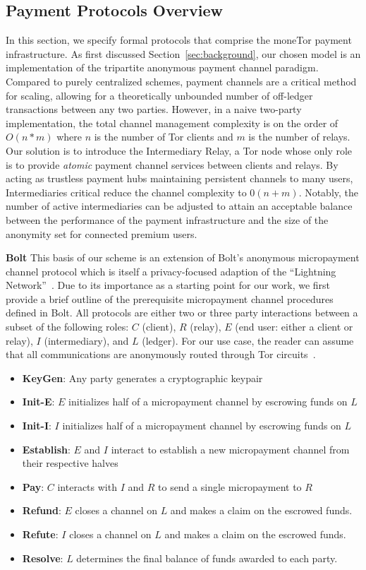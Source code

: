 \subsection{Payment Protocols Overview}
\label{sec:payment_overview}

In this section, we specify formal protocols that comprise the moneTor payment
infrastructure. As first discussed Section~\ref{sec:background}, our chosen
model is an implementation of the tripartite anonymous payment channel paradigm.
Compared to purely centralized schemes, payment channels are a critical method
for scaling, allowing for a theoretically unbounded number of off-ledger
transactions between any two parties. However, in a naive two-party
implementation, the total channel management complexity is on the order of
$O(n*m)$ where $n$ is the number of Tor clients and $m$ is the number of relays.
Our solution is to introduce the Intermediary Relay, a Tor node whose only role
is to provide \emph{atomic} payment channel services between clients and relays.
By acting as trustless payment hubs maintaining persistent channels to many
users, Intermediaries critical reduce the channel complexity to $0(n+m)$.
Notably, the number of active intermediaries can be adjusted to attain an
acceptable balance between the performance of the payment infrastructure and the
size of the anonymity set for connected premium users.

\textbf{Bolt} This basis of our scheme is an extension of Bolt's anonymous micropayment
channel protocol which is itself a privacy-focused adaption of the ``Lightning
Network''~\cite{poon2016bitcoin}. Due to its importance as a starting point for
our work, we first provide a brief outline of the prerequisite micropayment
channel procedures defined in Bolt. All protocols are either two or three party
interactions between a subset of the following roles: $C$ (client), $R$ (relay),
$E$ (end user: either a client or relay), $I$ (intermediary), and $L$ (ledger).
For our use case, the reader can assume that all communications are anonymously
routed through Tor circuits~\cite{green2017bolt}.

\begin{itemize}
\item \textbf{KeyGen}: Any party generates a cryptographic keypair
\item \textbf{Init-E}: $E$ initializes half of a micropayment channel by
  escrowing funds on $L$
\item \textbf{Init-I}: $I$ initializes half of a micropayment channel by
  escrowing funds on $L$
\item \textbf{Establish}: $E$ and $I$ interact to establish a new micropayment
  channel from their respective halves
\item \textbf{Pay}: $C$ interacts with $I$ and $R$ to send a single micropayment to $R$
\item \textbf{Refund}: $E$ closes a channel on $L$ and makes a claim on
  the escrowed funds.
\item \textbf{Refute}: $I$ closes a channel on $L$ and makes a claim on
  the escrowed funds.
\item \textbf{Resolve}: $L$ determines the final balance of funds awarded to
  each party.
\end{itemize}

